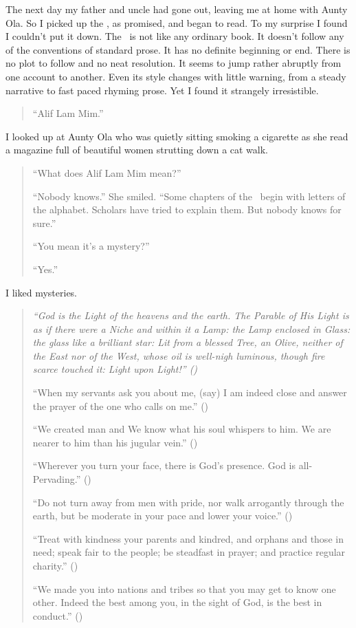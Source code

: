 \documentclass[12pt]{memoir}
\begin{document}
The next day my father and uncle had gone out,
leaving me at home with Aunty Ola.
So I picked up the \Quran, as promised, and began to read.
To my surprise I found I couldn’t put it down.
The \Quran\ is not like any ordinary book.
It doesn’t follow any of the conventions of standard prose.
It has no definite beginning or end.
There is no plot to follow and no neat resolution.
It seems to jump rather abruptly from one account to another.
Even its style changes with little warning,
from a steady narrative to fast paced rhyming prose.
Yet I found it strangely irresistible.

\begin{quote}
“Alif Lam Mim.”
\end{quote}

I looked up at Aunty Ola who was quietly sitting smoking a cigarette
as she read a magazine full of beautiful women strutting down a cat walk.

\begin{quote}
“What does Alif Lam Mim mean?”

“Nobody knows.” She smiled.
“Some chapters of the \Quran\ begin with letters of the alphabet.
Scholars have tried to explain them.
But nobody knows for sure.”

“You mean it’s a mystery?”

“Yes.”
\end{quote}

I liked mysteries.

\begin{quote}
\itshape
“God is the Light of the heavens and the earth.
The Parable of His Light is as if there were a Niche and within it a Lamp:
the Lamp enclosed in Glass: the glass like a brilliant star:
Lit from a blessed Tree, an Olive, neither of the East nor of the West,
whose oil is well-nigh luminous,
though fire scarce touched it: Light upon Light!” ()

“When my servants ask you about me, (say)
I am indeed close and answer the prayer of the one who calls on me.”
()

“We created man and We know what his soul whispers to him.
We are nearer to him than his jugular vein.” ()

“Wherever you turn your face, there is God’s presence.
God is all-Pervading.” ()

“Do not turn away from men with pride, nor walk arrogantly through the earth,
but be moderate in your pace and lower your voice.” ()

“Treat with kindness your parents and kindred, and orphans and those in need;
speak fair to the people; be steadfast in prayer;
and practice regular charity.” ()

“We made you into nations and tribes so that you may get to know one other.
Indeed the best among you, in the sight of God, is the best in conduct.”
()
\end{quote}
\end{document}
